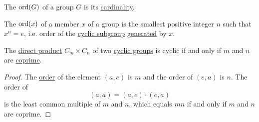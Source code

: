 \begin{definition}\label{def:group_order}
  The  \( \operatorname{ord}(G) \) of a group \( G \) is its \hyperref[thm:cardinality_existence]{cardinality}.

  The  \( \operatorname{ord}(x) \) of a member \( x \) of a group is the smallest positive integer \( n \) such that \( x^n = e \), i.e. order of the \hyperref[def:cyclic_group]{cyclic subgroup} \hyperref[def:group/submodel]{generated} by \( x \).
\end{definition}

\begin{proposition}\label{thn:product_of_cyclic_groups}
  The \hyperref[def:monoid_direct_product]{direct product} \( C_m \times C_n \) of two \hyperref[def:cyclic_group]{cyclic groups} is cyclic if and only if \( m \) and \( n \) are \hyperref[def:coprime_numbers]{coprime}.
\end{proposition}
\begin{proof}
  The \hyperref[def:group_order]{order} of the element \( (a, e) \) is \( m \) and the order of \( (e, a) \) is \( n \). The order of
  \begin{equation*}
    (a, a) = (a, e) \cdot (e, a)
  \end{equation*}
  is the least common multiple of \( m \) and \( n \), which equals \( mn \) if and only if \( m \) and \( n \) are coprime.
\end{proof}

